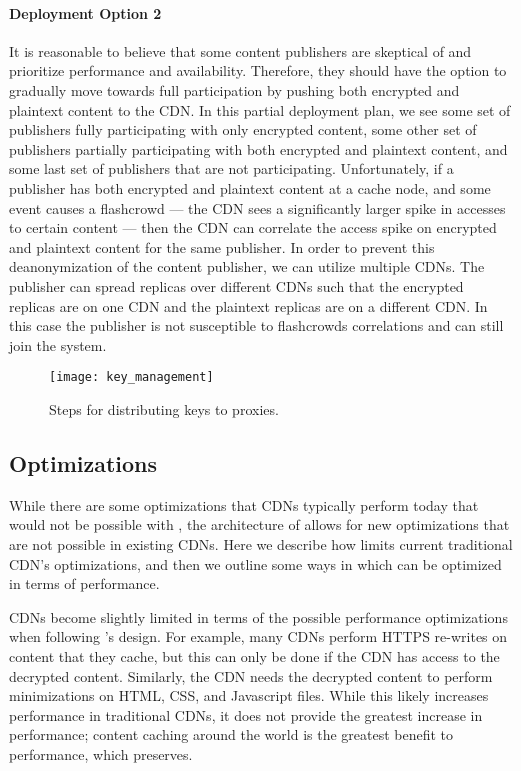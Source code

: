 \paragraph{Deployment Option 2} 
It is reasonable to believe that some content publishers are skeptical of \system{} and prioritize performance 
and availability.  Therefore, they should have the option to gradually move towards full participation by pushing 
both encrypted and plaintext content to the CDN.  In this partial deployment plan, we see some set of publishers 
fully participating with only encrypted content, some other set of publishers partially participating with both 
encrypted and plaintext content, and some last set of publishers that are not participating.  Unfortunately, if 
a publisher has both encrypted and plaintext content at a cache node, and some event causes a flashcrowd --- 
the CDN sees a significantly larger spike in accesses to certain content --- then the CDN can correlate the access 
spike on encrypted and plaintext content for the same publisher.  In order to prevent this deanonymization of the 
content publisher, we can utilize multiple CDNs.  The publisher can spread replicas over different CDNs such that 
the encrypted replicas are on one CDN and the plaintext replicas are on a different CDN.  In this case the publisher 
is not susceptible to flashcrowds correlations and can still join the system.

\begin{figure}[t]
\centering
\texttt{[image: key\_management]}
\caption{Steps for distributing keys to proxies.}
\label{fig:keys}
\end{figure}

\subsection{Optimizations}
\label{sec:optimizations}
While there are some optimizations that CDNs typically perform today that would not be possible with \system{}, the architecture 
of \system{} allows for new optimizations that are not possible in existing CDNs.  Here we describe how \system{} limits 
current traditional CDN's optimizations, and then we outline some ways in which \system{} 
can be optimized in terms of performance.

CDNs become slightly limited in terms of the possible performance optimizations when following \system{}'s design.  For example, 
many CDNs perform HTTPS re-writes on content that they cache, but this can only be done if the CDN has access to the 
decrypted content.  Similarly, the CDN needs the decrypted content to perform minimizations on HTML, CSS, and Javascript 
files.  While this likely increases performance in traditional CDNs, it does not provide the greatest increase in performance; 
content caching around the world is the greatest benefit to performance, which \system{} preserves.


